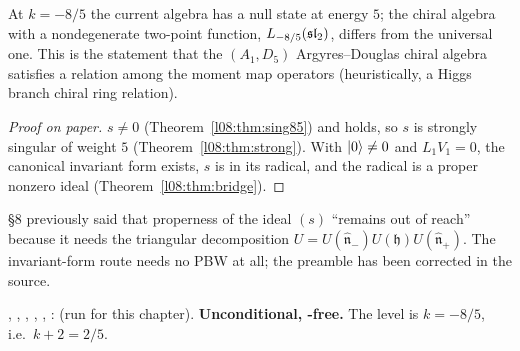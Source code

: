 \begin{physics}
At $k=-8/5$ the current algebra has a null state at energy $5$; the chiral algebra with a
nondegenerate two-point function, $L_{-8/5}(\mathfrak{sl}_2)$, differs from the universal one. This is the
statement that the $(A_1,D_5)$ Argyres--Douglas chiral algebra satisfies a relation among the moment
map operators (heuristically, a Higgs branch chiral ring relation).
\end{physics}

\begin{proof}[Proof on paper]
$s\ne0$ (Theorem~\ref{l08:thm:sing85}) and  holds, so $s$ is strongly singular of weight $5$
(Theorem~\ref{l08:thm:strong}). With $|0\rangle\ne0$ and $L_1V_1=0$, the canonical invariant form
exists, $s$ is in its radical, and the radical is a proper nonzero ideal (Theorem~\ref{l08:thm:bridge}).
\end{proof}

\begin{warning}[title={A superseded ``not reachable'' note}]
 \S8 previously said that properness of the ideal $(s)$ ``remains out
of reach'' because it needs the triangular decomposition $U = U(\widehat{\mathfrak n}_-)U(\mathfrak h)U(\widehat{\mathfrak n}_+)$.
The invariant-form route needs no PBW at all; the preamble has been corrected in the source.
\end{warning}

\begin{status}
\allowbreak{}\allowbreak{}, \allowbreak{}\allowbreak{}\allowbreak{}\allowbreak{},
\allowbreak{}\allowbreak{}\allowbreak{}\allowbreak{}\allowbreak{}, \allowbreak{}\allowbreak{}\allowbreak{}\allowbreak{}\allowbreak{},
\allowbreak{}\allowbreak{}\allowbreak{}\allowbreak{}\allowbreak{}, \allowbreak{}\allowbreak{}\allowbreak{}\allowbreak{}: \lean{[propext,
Classical.}\allowbreak{}\allowbreak\lean{sound]} (run for this chapter). \textbf{Unconditional, -free.} The level is
$k=-8/5$, i.e.\ $k+2 = 2/5$.
\end{status}
